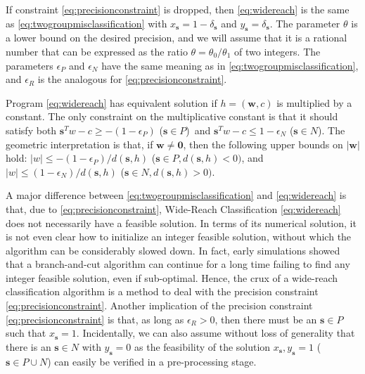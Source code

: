 \documentclass[11pt]{article}
\theoremstyle{definition}
\newcommand{\vect}[1]{\mathbf{#1}}
\newcommand{\sv}[1]{_{\vect{#1}}}
\newcommand{\sinp}{($\vect{s} \in P$)}
\newcommand{\sinn}{($\vect{s} \in N$)}
\begin{document}
If constraint \eqref{eq:precisionconstraint} is dropped, then
\eqref{eq:widereach} is the same as \eqref{eq:twogroupmisclassification}
with $x\sv{s} = 1 - \delta\sv{s}$ and $y\sv{s} = \delta\sv{s}$.
The parameter $\theta$ is a lower bound on the desired precision,
and we will assume that it is a rational number that can be expressed
as the ratio $\theta = \theta_0 / \theta_1$ of two integers.
The parameters $\epsilon_P$ and $\epsilon_N$ have the same meaning as 
in \eqref{eq:twogroupmisclassification}, and 
$\epsilon_R$ is the analogous for \eqref{eq:precisionconstraint}.

Program \eqref{eq:widereach} has equivalent solution if $h = (\vect{w}, c)$
is multiplied by a constant.
The only constraint on the multiplicative constant is that
it should satisfy both
$\vect{s}^T w - c \geq - (1 - \epsilon_P)$ \sinp\, and
$\vect{s}^T w - c \leq 1 - \epsilon_N$ \sinn.
The geometric interpretation is that, if $\vect{w} \neq \vect{0}$,
then the following upper bounds on $|\vect{w}|$ hold:
$|w| \leq - (1 - \epsilon_P) / d(\vect{s}, h)$ 
($\vect{s} \in P, d(\vect{s}, h) < 0)$, and
$|w| \leq (1 - \epsilon_N) / d(\vect{s}, h)$ 
($\vect{s} \in N, d(\vect{s}, h) > 0)$.

A major difference between \eqref{eq:twogroupmisclassification}
and \eqref{eq:widereach} is that, due to \eqref{eq:precisionconstraint},
Wide-Reach Classification \eqref{eq:widereach}
does not necessarily have a feasible solution.
In terms of its numerical solution, it is not even clear how to initialize
an integer feasible solution, without which the algorithm can be 
considerably slowed down. 
In fact, early simulations showed that a branch-and-cut algorithm can continue
for a long time failing to find any integer feasible solution, even if
sub-optimal.
Hence, the crux of a wide-reach classification algorithm is a method
to deal with the precision constraint \eqref{eq:precisionconstraint}.
Another implication of the precision constraint \eqref{eq:precisionconstraint}
is that, as long as $\epsilon_R > 0$, then there must be an $\vect{s} \in P$
such that $x\sv{s} = 1$.
Incidentally, we can also assume without loss of generality that
there is an $\vect{s} \in N$ with $y\sv{s} = 0$ as the feasibility of 
the solution $x\sv{s}, y\sv{s} = 1$ ($\vect{s} \in P \cup N$)
can easily be verified in a pre-processing stage.
\end{document}
